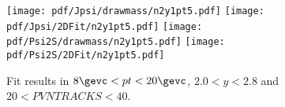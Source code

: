 \begin{figure}[H]
\begin{center}
\texttt{[image: pdf/Jpsi/drawmass/n2y1pt5.pdf]}
\texttt{[image: pdf/Jpsi/2DFit/n2y1pt5.pdf]}
\vspace*{-0.5cm}
\texttt{[image: pdf/Psi2S/drawmass/n2y1pt5.pdf]}
\texttt{[image: pdf/Psi2S/2DFit/n2y1pt5.pdf]}
\vspace*{-0.5cm}
\end{center}
\caption{Fit results in $8\gevc<pt<20\gevc$, $2.0<y<2.8$ and $20<PVNTRACKS<40$.}
\label{Fitn2y1pt5}
\end{figure}

